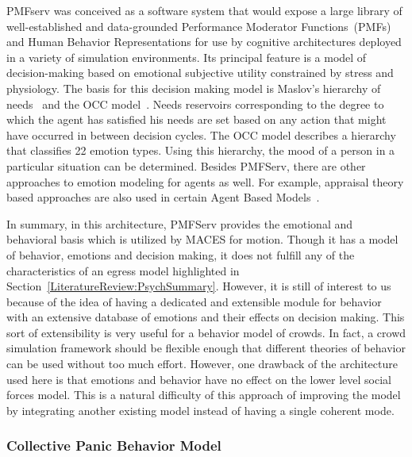 PMFserv was conceived as a software system that would expose a large library of well-established and data-grounded Performance Moderator Functions~(PMFs) and Human Behavior Representations for use by cognitive architectures deployed in a variety of simulation environments. Its principal feature is a model of decision-making based on emotional subjective utility constrained by stress and physiology. The basis for this decision making model is Maslov's hierarchy of needs~\cite{Maslow:1943vr} and the OCC model~\cite{Orton:1990tx}. Needs reservoirs corresponding to the degree to which the agent has satisfied his needs are set based on any action that might have occurred in between decision cycles. The OCC model describes a hierarchy that classifies 22 emotion types. Using this hierarchy, the mood of a person in a particular situation can be determined. Besides PMFServ, there are other approaches to emotion modeling for agents as well. For example, appraisal theory based approaches are also used in certain Agent Based Models~\cite{Aydt:2011wz}.

In summary, in this architecture, PMFServ provides the emotional and behavioral basis which is utilized by MACES for motion. Though it has a model of behavior, emotions and decision making, it does not fulfill any of the characteristics of an egress model highlighted in Section~\ref{LiteratureReview:PsychSummary}. However, it is still of interest to us because of the idea of having a dedicated and extensible module for behavior with an extensive database of emotions and their effects on decision making. This sort of extensibility is very useful for a behavior model of crowds. In fact, a crowd simulation framework should be flexible enough that different theories of behavior can be used without too much effort. However, one drawback of the architecture used here is that emotions and behavior have no effect on the lower level social forces model. This is a natural difficulty of this approach of improving the model by integrating another existing model instead of having a single coherent mode.

\subsubsection{Collective Panic Behavior Model}


